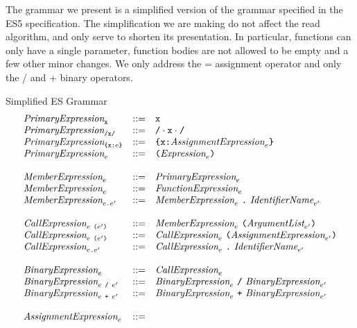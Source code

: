 \documentclass[preprint,10pt]{sigplanconf}
\begin{document}
The grammar we present is a simplified version of the grammar
specified in the ES5 specification. The simplification we are making
do not affect the read algorithm, and only serve to shorten its
presentation. In particular, functions can only have a single
parameter, function bodies are not allowed to be empty and a few other
minor changes. We only address the = assignment operator and only the
/ and + binary operators.

\begin{displayfigure*}{\label{fig:grammar}Simplified ES Grammar}
\[
\begin{array}{lcl}
  \textit{PrimaryExpression}_{\texttt{x}} &::=& \texttt{x} 
  \\
  \textit{PrimaryExpression}_{\texttt{/x/}} &::=& \texttt{/} \cdot \texttt{x} \cdot \texttt{/} 
  \\
  \textit{PrimaryExpression}_{\texttt{\{}\texttt{x} \texttt{:} e\texttt{\}}} &::=& 
  \texttt{\{}\texttt{x} \texttt{:} \textit{AssignmentExpression}_{e}\texttt{\}}
  \\
  \textit{PrimaryExpression}_{e} &::=& 
  \texttt{(}\textit{Expression}_{e}\texttt{)}
  \\ \\
  \textit{MemberExpression}_{e} &::=&
  \textit{PrimaryExpression}_{e}
  \\
  \textit{MemberExpression}_{e} &::=&
  \textit{FunctionExpression}_{e}
  \\
  \textit{MemberExpression}_{e\texttt{.}e'} &::=&
  \textit{MemberExpression}_{e}~\texttt{.}~\textit{IdentifierName}_{e'}
  \\ \\
  \textit{CallExpression}_{e~\texttt{(}e'\texttt{)}} &::=& 
  \textit{MemberExpression}_{e}~
  \texttt{(}\textit{ArgumentList}_{e'}\texttt{)}
  \\
  \textit{CallExpression}_{e~\texttt{(}e'\texttt{)}} &::=& 
  \textit{CallExpression}_{e}~
  \texttt{(}\textit{AssignmentExpression}_{e'}\texttt{)}
  \\
  \textit{CallExpression}_{e\texttt{.}e'} &::=& 
  \textit{CallExpression}_{e}~\texttt{.}~
  \textit{IdentifierName}_{e'}
  \\ \\
  \textit{BinaryExpression}_{e} &::=& \textit{CallExpression}_{e} \\
  \textit{BinaryExpression}_{e ~\texttt{/}~ e'}
  &::=&
  \textit{BinaryExpression}_{e} ~\texttt{/}~ \textit{BinaryExpression}_{e'} \\
  \textit{BinaryExpression}_{e ~\texttt{+}~ e'}
  &::=&
  \textit{BinaryExpression}_{e} ~\texttt{+}~ \textit{BinaryExpression}_{e'}
  \\ \\
  \textit{AssignmentExpression}_{e} &::=&

\end{array}\]
\end{displayfigure*}
\end{document}
